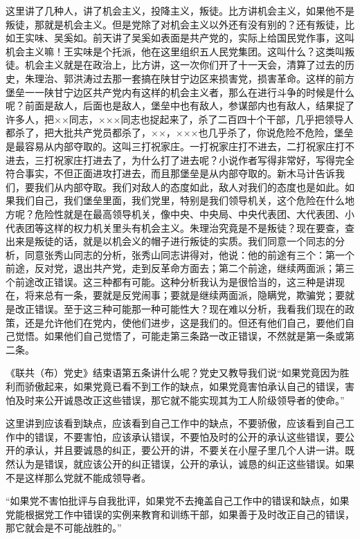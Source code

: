 这里讲了几种人，讲了机会主义，投降主义，叛徒。比方讲机会主义，如果他不是叛徒，那就是机会主义。但是党除了对机会主义以外还有没有别的？还有叛徒，比如王实味、吴奚如。前天讲了吴奚如表面是共产党的，实际上给国民党作事，这叫机会主义嘛！王实味是个托派，他在这里组织五人民党集团。这叫什么？这类叫叛徒。机会主义就是在政治上，比方讲，这一次你们开了十一天会，清算了过去的历史，朱理治、郭洪涛过去那一套搞在陕甘宁边区来损害党，损害革命。这样的前方堡垒一一陕甘宁边区共产党内有这样的机会主义者，那么在进行斗争的时候是什么呢？前面是敌人，后面也是敌人，堡垒中也有敌人，参谋部内也有敌人，结果捉了许多人，把××同志，×××同志也捉起来了，杀了二百四十个干部，几乎把领导人都杀了，把大批共产党员都杀了，××，×××也几乎杀了，你说危险不危险，堡垒是最容易从内部夺取的。这叫三打祝家庄。一打祝家庄打不进去，二打祝家庄打不进去，三打祝家庄打进去了，为什么打了进去呢？小说作者写得非常好，写得完全符合事实，不但正面进攻打进去，而且那堡垒是从内部夺取的。新木马计告诉我们，要我们从内部夺取。我们对敌人的态度如此，敌人对我们的态度也是如此。如果我们自己，我们堡垒里面，我们党里，特别是我们领导机关，这个危险在什么地方呢？危险性就是在最高领导机关，像中央、中央局、中央代表团、大代表团、小代表团等这样的权力机关里头有机会主义。朱理治究竟是不是叛徒？现在要查，查出来是叛徒的话，就是以机会义的帽子进行叛徒的实质。我们同意一个同志的分析，同意张秀山同志的分析，张秀山同志讲得对，他说：他的前途有三个：第一个前途，反对党，退出共产党，走到反革命方面去；第二个前途，继续两面派；第三个前途改正错误。这三种都有可能。这种分析我认为是很恰当的，这三种是讲现在，将来总有一条，要就是反党闹事；要就是继续两面派，隐瞒党，欺骗党；要就是改正错误。至于这三种可能那一种可能性大？现在难以分析，我看我们现在的政策，还是允许他们在党内，使他们进步，这是我们的。但还有他们自己，要他们自己觉悟。如果他们自己觉悟了，可能走第三条路一改正错误，不然就是第一条或第二条。

《联共（布）党史》结束语第五条讲什么呢？党史又教导我们说“如果党竟因为胜利而骄傲起来，如果党竟已看不到工作的缺点，如果党竟害怕承认自己的错误，害怕及时来公开诚恳改正这些错误，那它就不能实现其为工人阶级领导者的使命。”

这里讲到应该看到缺点，应该看到自己工作中的缺点，不要骄傲，应该看到自己工作中的错误，不要害怕，应该承认错误，不要怕及时的公开的承认这些错误，要公开的承认，并且要诚恳的纠正，要公开的讲，不要关在小屋子里几个人讲一讲。既然认为是错误，就应该公开的纠正错误，公开的承认，诚恳的纠正这些错误。如果不是这样那么党就不能成领导者。

“如果党不害怕批评与自我批评，如果党不去掩盖自己工作中的错误和缺点，如果党能根据党工作中错误的实例来教育和训练干部，如果善于及时改正自己的错误，那它就会是不可能战胜的。”

